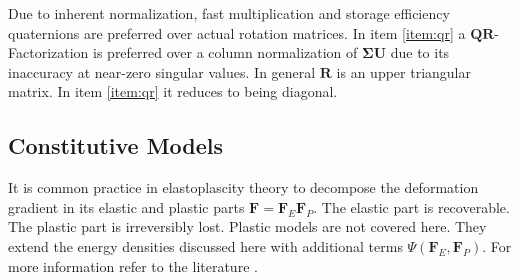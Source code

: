 \documentclass[m,times]{cgMA}
\begin{document}
Due to inherent normalization, fast multiplication and storage efficiency quaternions are preferred over actual rotation matrices. In item \ref{item:qr} a $\boldsymbol{QR}$-Factorization is preferred over a column normalization of $\boldsymbol{\Sigma U}$ due to its inaccuracy at near-zero singular values. In general $\boldsymbol{R}$ is an upper triangular matrix. In item \ref{item:qr} it reduces to being diagonal.
\cite{MPM:COURSE}

\subsection{Constitutive Models}\label{seq:constitutive_models}
It is common practice in elastoplascity theory to decompose the deformation gradient in its elastic and plastic parts $\boldsymbol{F} = \boldsymbol{F}_E \boldsymbol{F}_P$. The elastic part is recoverable. The plastic part is irreversibly lost. Plastic models are not covered here. They extend the energy densities discussed here with additional terms $\Psi(\boldsymbol{F}_E,\boldsymbol{F}_P)$. For more information refer to the literature \cite{ochsner2014elasto}.
\end{document}
